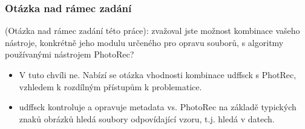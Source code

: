 \documentclass[aspectratio=169]{beamer}
\begin{document}
        \begin{frame}
            \frametitle{Otázka nad rámec zadání}
            \vspace{40pt}
            \large
            (Otázka nad rámec zadání této práce): zvažoval jste možnost kombinace vašeho nástroje, konkrétně jeho modulu určeného pro opravu souborů, s algoritmy používanými nástrojem PhotoRec?
            \vspace{15pt}
            \begin{itemize}
                \item V tuto chvíli ne. Nabízí se otázka vhodnosti kombinace udffsck s PhotRec, vzhledem k rozdílným přístupům k problematice.
                \item udffsck kontroluje a opravuje metadata vs. PhotoRec na základě typických znaků obrázků hledá soubory odpovídající vzoru, t.j. hledá v datech.
            \end{itemize}
        \end{frame}
\end{document}
